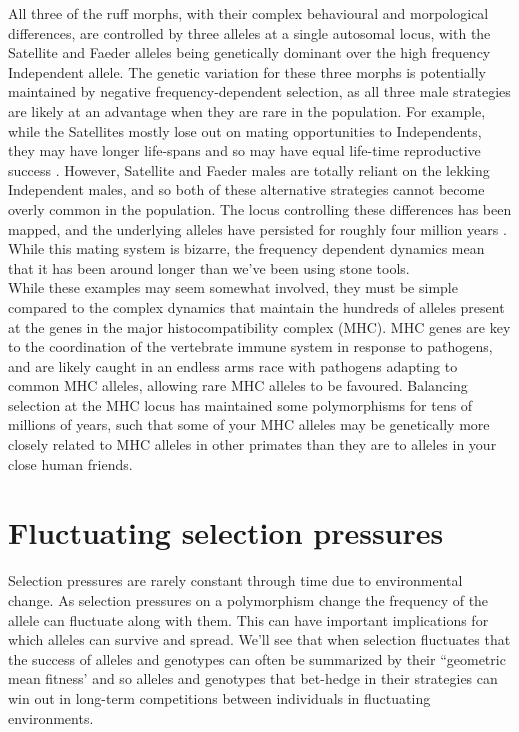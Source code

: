 All three of the ruff morphs, with their complex behavioural and morpological differences,
are controlled by three alleles at a single autosomal locus, with the
Satellite and Faeder alleles being genetically dominant over the high frequency
Independent allele. The genetic variation for these three morphs is potentially maintained by
negative frequency-dependent selection, as all three male strategies
are likely at an advantage when they are rare in the population. For
example, while the Satellites mostly lose out on mating opportunities
to Independents, they may have longer life-spans and so may have equal
life-time reproductive success \citep{widemo1998alternative}. However, Satellite and Faeder males
are totally reliant on the lekking Independent males, and so both of
these alternative strategies cannot become overly common in the
population. The locus controlling these differences has been mapped,
and the underlying alleles have persisted for roughly four million years
\citep{kupper2016supergene,lamichhaney2016structural}. While this mating system is
bizarre, the frequency dependent dynamics mean that it has been around
longer than we've been using stone tools. \\ 

While these examples may seem somewhat involved, they must be simple
compared to the complex dynamics that maintain the hundreds of alleles
present at the genes in the major histocompatibility complex (MHC). MHC
genes are key to the coordination of the vertebrate immune
system in response to pathogens, and are likely caught in an endless arms
race with pathogens adapting to common MHC alleles, allowing rare MHC
alleles to be favoured. Balancing selection at the MHC locus has maintained
some polymorphisms for tens of millions of years, such that some of
your MHC alleles may be genetically more closely related to MHC alleles in other primates than they are to alleles in your
close human friends. 


\section{Fluctuating selection pressures}
Selection pressures are rarely constant through time due to
environmental change.  As selection pressures on a polymorphism change
the frequency of the allele can fluctuate along with them. This can have important implications for which
alleles can survive and spread. We'll see that when selection
fluctuates that the success of alleles and genotypes can often be summarized
by their ``geometric mean fitness' and so alleles and genotypes
that bet-hedge in their strategies can win out in long-term competitions
between individuals in fluctuating environments.

